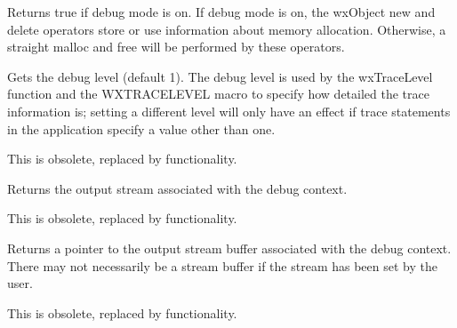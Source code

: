

\label{wxdebugcontextgetdebugmode}


Returns true if debug mode is on. If debug mode is on, the wxObject new and delete
operators store or use information about memory allocation. Otherwise,
a straight malloc and free will be performed by these operators.



\label{wxdebugcontextgetlevel}


Gets the debug level (default 1). The debug level is used by the wxTraceLevel function and
the WXTRACELEVEL macro to specify how detailed the trace information is; setting
a different level will only have an effect if trace statements in the application
specify a value other than one.

This is obsolete, replaced by  functionality.



\label{wxdebugcontextgetstream}


Returns the output stream associated with the debug context.

This is obsolete, replaced by  functionality.



\label{wxdebugcontextgetstreambuf}


Returns a pointer to the output stream buffer associated with the debug context.
There may not necessarily be a stream buffer if the stream has been set
by the user.

This is obsolete, replaced by  functionality.

